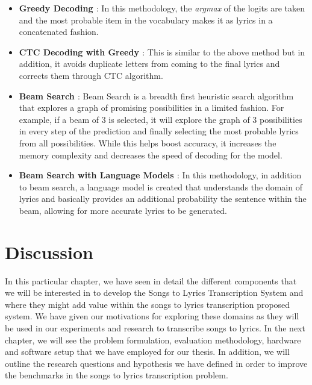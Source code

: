 \begin{itemize}
    \item \textbf{Greedy Decoding \cite{zhang2023dive}} : In this methodology, the \textit{argmax} of the logits are taken and the most probable item in the vocabulary makes it as lyrics in a concatenated fashion.
    \item \textbf{CTC Decoding with Greedy \cite{sutskever2014sequence}}: This is similar to the above method but in addition, it avoids duplicate letters from coming to the final lyrics and corrects them through CTC algorithm.
    \item \textbf{Beam Search \cite{zhang2023dive}} : Beam Search is a breadth first heuristic search algorithm that explores a graph of promising possibilities in a limited fashion. For example, if a beam of 3 is selected, it will explore the graph of 3 possibilities in every step of the prediction and finally selecting the most probable lyrics from all possibilities. While this helps boost accuracy, it increases the memory complexity and decreases the speed of decoding for the model.
    \item  \textbf{Beam Search with Language Models \cite{sutskever2014sequence}}: In this methodology, in addition to beam search, a language model is created that understands the domain of lyrics and basically provides an additional probability the sentence within the beam, allowing for more accurate lyrics to be generated.
\end{itemize}

\section{Discussion}%
\label{sec:foundationaltheorydiscussion}

In this particular chapter, we have seen in detail the different components that we will be interested in to develop the Songs to Lyrics Transcription System and where they might add value within the songs to lyrics transcription proposed system. We have given our motivations for exploring these domains as they will be used in our experiments and research to transcribe songs to lyrics. In the next chapter, we will see the problem formulation, evaluation methodology, hardware and software setup that we have employed for our thesis. In addition, we will outline the research questions and hypothesis we have defined in order to improve the benchmarks in the songs to lyrics transcription problem.
